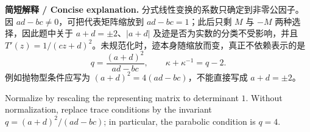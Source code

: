 \documentclass[11pt,a4paper]{ctexart}
\begin{document}
\textbf{简短解释 / Concise explanation.}
分式线性变换的系数只确定到非零公因子。因 $ad-bc\ne0$，可把代表矩阵缩放到
$ad-bc=1$；此后只剩 $M$ 与 $-M$ 两种选择，因此题中关于
$a+d=\pm2$、$|a+d|$ 及迹是否为实数的分类不受影响，并且
$T'(z)=1/(cz+d)^2$。未规范化时，迹本身随缩放而变，真正不依赖表示的是
\[
 q=\frac{(a+d)^2}{ad-bc},\qquad
 \kappa+\kappa^{-1}=q-2.
\]
例如抛物型条件应写为 $(a+d)^2=4(ad-bc)$，不能直接写成
$a+d=\pm2$。

Normalize by rescaling the representing matrix to determinant $1$.
Without normalization, replace trace conditions by the invariant
$q=(a+d)^2/(ad-bc)$; in particular, the parabolic condition is $q=4$.

\end{document}

